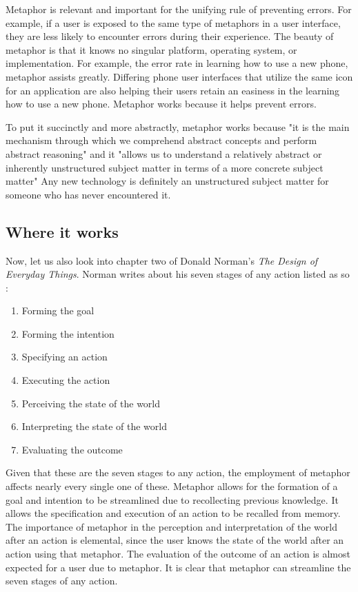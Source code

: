 \documentclass[11pt, oneside]{article}
\begin{document}
Metaphor is relevant and important for the unifying rule of preventing errors. For example, if a user is exposed to the same type of metaphors in a user interface, they are less likely to encounter errors during their experience. The beauty of metaphor is that it knows no singular platform, operating system, or implementation. For example, the error rate in learning how to use a new phone, metaphor assists greatly. Differing phone user interfaces that utilize the same icon for an application are also helping their users retain an easiness in the learning how to use a new phone. Metaphor works because it helps prevent errors.

To put it succinctly and more abstractly, metaphor works because "it is the main mechanism through which we comprehend abstract concepts and perform abstract reasoning" and it "allows us to understand a relatively abstract or inherently unstructured subject matter in terms of a more concrete subject matter" \cite{metaphor-theory-practice} Any new technology is definitely an unstructured subject matter for someone who has never encountered it.

\subsection{Where it works}
Now, let us also look into chapter two of Donald Norman's \textit{The Design of Everyday Things}. Norman writes about his seven stages of any action listed as so \cite{norman-seven-stages}:
\begin{enumerate}
\item Forming the goal
\item Forming the intention
\item Specifying an action
\item Executing the action
\item Perceiving the state of the world
\item Interpreting the state of the world
\item Evaluating the outcome
\end{enumerate}

Given that these are the seven stages to any action, the employment of metaphor affects nearly every single one of these. Metaphor allows for the formation of a goal and intention to be streamlined due to recollecting previous knowledge. It allows the specification and execution of an action to be recalled from memory. The importance of metaphor in the perception and interpretation of the world after an action is elemental, since the user knows the state of the world after an action using that metaphor. The evaluation of the outcome of an action is almost expected for a user due to metaphor. It is clear that metaphor can streamline the seven stages of any action.
\end{document}
